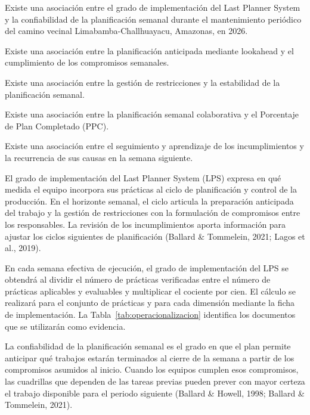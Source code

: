 \documentclass[12pt,a4paper]{article}
\begin{document}
Existe una asociación entre el grado de implementación del Last Planner System y la confiabilidad de la planificación semanal durante el mantenimiento periódico del camino vecinal Limabamba-Challhuayacu, Amazonas, en 2026.

\begin{listaTrasTitulo}
\item Existe una asociación entre la planificación anticipada mediante lookahead y el cumplimiento de los compromisos semanales.
\item Existe una asociación entre la gestión de restricciones y la estabilidad de la planificación semanal.
\item Existe una asociación entre la planificación semanal colaborativa y el Porcentaje de Plan Completado (PPC).
\item Existe una asociación entre el seguimiento y aprendizaje de los incumplimientos y la recurrencia de sus causas en la semana siguiente.
\end{listaTrasTitulo}

El grado de implementación del Last Planner System (LPS) expresa en qué medida el equipo incorpora sus prácticas al ciclo de planificación y control de la producción. En el horizonte semanal, el ciclo articula la preparación anticipada del trabajo y la gestión de restricciones con la formulación de compromisos entre los responsables. La revisión de los incumplimientos aporta información para ajustar los ciclos siguientes de planificación (Ballard \& Tommelein, 2021; Lagos et al., 2019).

En cada semana efectiva de ejecución, el grado de implementación del LPS se obtendrá al dividir el número de prácticas verificadas entre el número de prácticas aplicables y evaluables y multiplicar el cociente por cien. El cálculo se realizará para el conjunto de prácticas y para cada dimensión mediante la ficha de implementación. La Tabla~\ref{tab:operacionalizacion} identifica los documentos que se utilizarán como evidencia.

La confiabilidad de la planificación semanal es el grado en que el plan permite anticipar qué trabajos estarán terminados al cierre de la semana a partir de los compromisos asumidos al inicio. Cuando los equipos cumplen esos compromisos, las cuadrillas que dependen de las tareas previas pueden prever con mayor certeza el trabajo disponible para el periodo siguiente (Ballard \& Howell, 1998; Ballard \& Tommelein, 2021).
\end{document}
